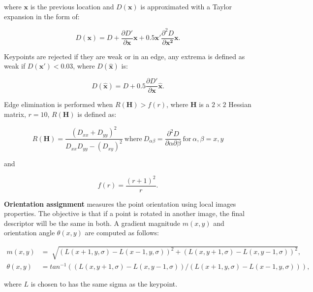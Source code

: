 \documentclass[12pt]{article}
\begin{document}
where $\mathbf{x}$ is the previous location and $D(\mathbf{x})$ is approximated with a Taylor expansion in the form of:

\begin{equation}
D(\mathbf{x}) = D + \frac{ \partial D'}{\partial \mathbf{x}} \mathbf{x} + 0.5 \mathbf{x}' \frac{\partial^2 D}{\partial \mathbf{x^2}}\mathbf{x}.
\end{equation}

Keypoints are rejected if they are weak or in an edge, any extrema is defined as weak if $D(\mathbf{x'}) < 0.03$, where $D(\mathbf{\hat{x}})$ is:

\begin{equation}
D(\mathbf{\hat{x}}) = D + 0.5 \frac{\partial D'}{\partial \mathbf{x}}\mathbf{\hat{x}}.
\end{equation}

Edge elimination is performed when $R(\mathbf{H}) > f(r)$, where $\mathbf{H}$ is a $2 \times 2$ Hessian matrix, $r = 10$, $R(\mathbf{H})$ is defined as:

\begin{equation}
R(\mathbf{H})= \frac{ (D_{xx} + D_{yy})^2 }{ D_{xx} D_{yy} - (D_{xy})^2} ~ \text{where} ~ D_{\alpha \beta} = \frac{\partial^2 D}{\partial \alpha \partial \beta} ~  \text{for} ~ \alpha, \beta = x, y
\end{equation}

and 

\begin{equation}
f(r) = \frac{(r + 1)^2}{r}.
\end{equation}

\textbf{Orientation assignment} measures the point orientation using local images properties.
The objective is that if a point is rotated in another image, the final descriptor will be the same in both.
A gradient magnitude $m(x,y)$ and orientation angle $\theta(x,y)$ are computed as follows:

\begin{equation}
\begin{aligned}
	m(x,y) &= \sqrt[]{(L(x+1,y,\sigma) - L(x-1,y,\sigma))^2 + (L(x,y+1,\sigma) - L(x,y-1,\sigma))^2}, \\
	\theta(x,y) &= tan^{-1} \left( \left( L(x,y+1,\sigma) - L(x, y-1, \sigma) \right) / \left( L(x+1,y,\sigma) - L(x-1, y, \sigma) \right) \right),
\end{aligned} \label{eq:conv}
\end{equation}

where $L$ is chosen to has the same sigma as the keypoint.
\end{document}
